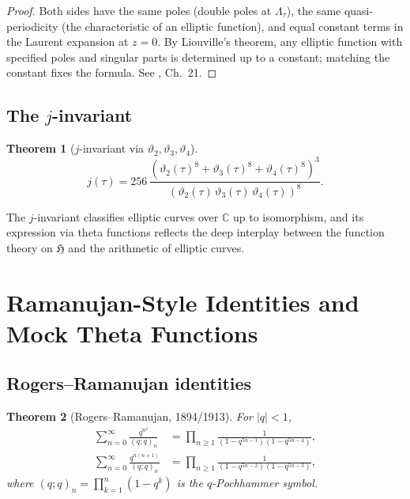 \documentclass[12pt,a4paper]{amsart}
\newtheorem{theorem}{Theorem}[section]
\theoremstyle{definition}
\begin{document}
\begin{proof}
Both sides have the same poles (double poles at $\Lambda_\tau$), the same
quasi-periodicity (the characteristic of an elliptic function), and equal constant
terms in the Laurent expansion at $z=0$.  By Liouville's theorem, any elliptic
function with specified poles and singular parts is determined up to a constant;
matching the constant fixes the formula. See \cite{WhittakerWatson1927}, Ch.~21.
\end{proof}

\subsection{The $j$-invariant}

\begin{theorem}[$j$-invariant via $\vartheta_2, \vartheta_3, \vartheta_4$]
\[
  j(\tau)
  = 256\,\frac{(\vartheta_2(\tau)^8 + \vartheta_3(\tau)^8 + \vartheta_4(\tau)^8)^3}
              {(\vartheta_2(\tau)\,\vartheta_3(\tau)\,\vartheta_4(\tau))^8}.
\]
\end{theorem}

The $j$-invariant classifies elliptic curves over $\mathbb{C}$ up to isomorphism,
and its expression via theta functions reflects the deep interplay between
the function theory on $\mathfrak{H}$ and the arithmetic of elliptic curves.

\section{Ramanujan-Style Identities and Mock Theta Functions}\label{sec:ramanujan}

\subsection{Rogers--Ramanujan identities}

\begin{theorem}[Rogers--Ramanujan, 1894/1913]\label{thm:RR}
For $|q| < 1$,
\begin{align}
  \sum_{n=0}^{\infty} \frac{q^{n^2}}{(q;q)_n}
  &= \prod_{n\geq1}\frac{1}{(1-q^{5n-1})(1-q^{5n-4})},
  \label{eq:RR1}\\
  \sum_{n=0}^{\infty} \frac{q^{n(n+1)}}{(q;q)_n}
  &= \prod_{n\geq1}\frac{1}{(1-q^{5n-2})(1-q^{5n-3})},
  \label{eq:RR2}
\end{align}
where $(q;q)_n = \prod_{k=1}^n(1-q^k)$ is the $q$-Pochhammer symbol.
\end{theorem}
\end{document}
